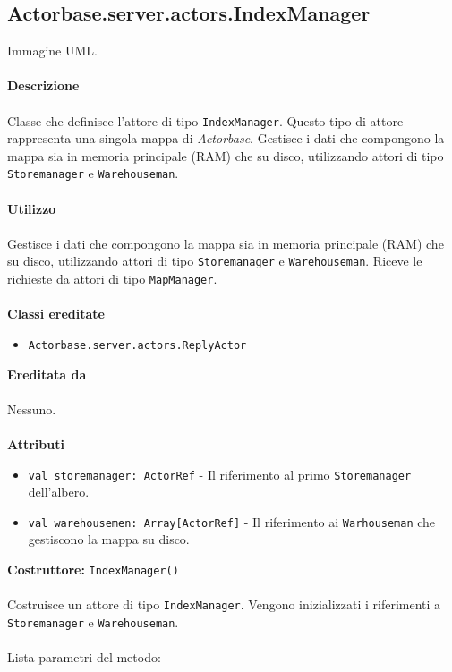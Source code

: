 \documentclass[a4paper]{article}
\begin{document}
	\subsection{Actorbase.server.actors.IndexManager}
		Immagine UML.
		\\ \\
		\textbf{Descrizione}
			\\ \\
			Classe che definisce l'attore di tipo \texttt{IndexManager}. Questo tipo di attore rappresenta una singola mappa di \emph{Actorbase}. Gestisce i dati che compongono la mappa sia in memoria principale (RAM) che su disco, utilizzando attori di tipo \texttt{Storemanager} e \texttt{Warehouseman}.
			\\ \\
		\textbf{Utilizzo}
			\\ \\
			Gestisce i dati che compongono la mappa sia in memoria principale (RAM) che su disco, utilizzando attori di tipo \texttt{Storemanager} e \texttt{Warehouseman}. Riceve le richieste da attori di tipo \texttt{MapManager}.
			\\ \\
		\textbf{Classi ereditate}
			\begin{itemize}
				\item \texttt{Actorbase.server.actors.ReplyActor}
			\end{itemize}
		\textbf{Ereditata da}
			\\ \\
			Nessuno.
			\\ \\
		\textbf{Attributi}
			\begin{itemize}
				\item \texttt{val storemanager: ActorRef} - Il riferimento al primo \texttt{Storemanager} dell'albero. 
				\item \texttt{val warehousemen: Array[ActorRef]} - Il riferimento ai \texttt{Warhouseman} che gestiscono la mappa su disco.
			\end{itemize}
		\textbf{Costruttore: }\texttt{IndexManager()}
			\\ \\
			Costruisce un attore di tipo \texttt{IndexManager}. Vengono inizializzati i riferimenti a \texttt{Storemanager} e \texttt{Warehouseman}.
			\\ \\
			Lista parametri del metodo:
			\\ \\
\end{document}
